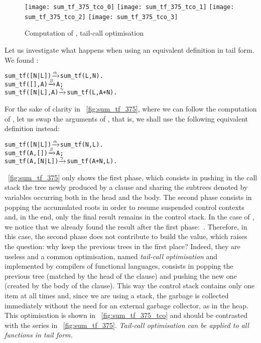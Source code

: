 \begin{figure}
\centering
\texttt{[image: sum\_tf\_375\_tco\_0]}
\texttt{[image: sum\_tf\_375\_tco\_1]}
\texttt{[image: sum\_tf\_375\_tco\_2]}
\texttt{[image: sum\_tf\_375\_tco\_3]}
\caption{Computation of , 
tail\hyp{}call optimisation\label{fig:sum_tf_375_tco}}
\end{figure}
Let us investigate what happens when using an equivalent definition in
tail form. We found :
\begin{alltt}
sum_tf([N|L])   \(\smashedrightarrow{\alpha}\) sum_tf(L,N).
sum_tf(   [],A) \(\smashedrightarrow{\beta}\) A;
sum_tf([N|L],A) \(\smashedrightarrow{\gamma}\) sum_tf(L,A+N).
\end{alltt}
For the sake of clarity in \fig~\vref{fig:sum_tf_375}, where we can
follow the computation of , let us swap the
arguments of , that is, we shall use the following
equivalent definition instead:
\begin{alltt}
sum_tf([N|L])   \(\smashedrightarrow{\alpha}\) sum_tf(N,L).
sum_tf(A,   []) \(\smashedrightarrow{\beta}\) A;
sum_tf(A,[N|L]) \(\smashedrightarrow{\gamma}\) sum_tf(A+N,L).
\end{alltt}
\Fig~\vref{fig:sum_tf_375} only shows the first phase, which consists
in pushing in the call stack the tree newly produced by a clause and
sharing the subtrees denoted by variables occurring both in the head
and the body. The second phase consists in popping the accumulated
roots in order to resume suspended control contexts and, in the end,
only the final result remains in the control stack. In the case
of , we notice that we already found the result
after the first phase:~. Therefore, in this case, the
second phase does not contribute to build the value, which raises the
question: why keep the previous trees in the first place? Indeed, they
are useless and a common optimisation, named \emph{tail\hyp{}call
  optimisation} and implemented by compilers of functional languages,
consists in popping the previous tree (matched by the head of the
clause) and pushing the new one (created by the body of the
clause). This way the control stack contains only one item at all
times and, since we are using a stack, the garbage is collected
immediately without the need for an external garbage collector, as in
the heap. This optimisation is shown in \fig~\vref{fig:sum_tf_375_tco}
and should be contrasted with the series in
\fig~\vref{fig:sum_tf_375}. \emph{Tail\hyp{}call optimisation can be
  applied to all functions in tail form.}

